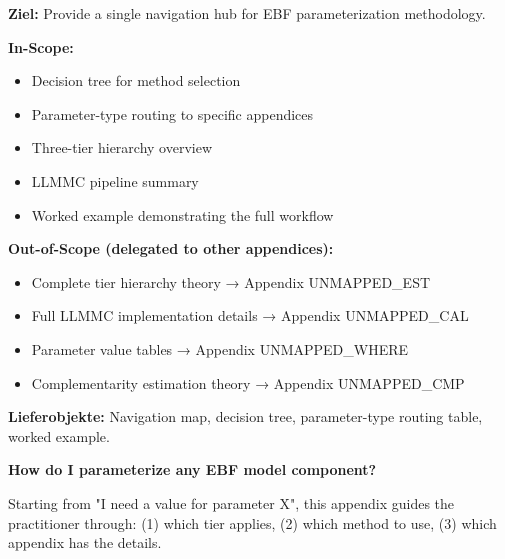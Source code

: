 \begin{tcolorbox}[colback=gray!5!white, colframe=gray!75!black, title=Appendix Scope:]
\textbf{Ziel:} Provide a single navigation hub for EBF parameterization methodology.

\textbf{In-Scope:}
\begin{itemize}[nosep]
    \item Decision tree for method selection
    \item Parameter-type routing to specific appendices
    \item Three-tier hierarchy overview
    \item LLMMC pipeline summary
    \item Worked example demonstrating the full workflow
\end{itemize}

\textbf{Out-of-Scope (delegated to other appendices):}
\begin{itemize}[nosep]
    \item Complete tier hierarchy theory → Appendix UNMAPPED_EST
    \item Full LLMMC implementation details → Appendix UNMAPPED_CAL
    \item Parameter value tables → Appendix UNMAPPED_WHERE
    \item Complementarity estimation theory → Appendix UNMAPPED_CMP
\end{itemize}

\textbf{Lieferobjekte:} Navigation map, decision tree, parameter-type routing table, worked example.
\end{tcolorbox}


\begin{tcolorbox}[colback=orange!5!white, colframe=orange!75!black, title=Fundamental Question]
\textbf{How do I parameterize any EBF model component?}

Starting from "I need a value for parameter X", this appendix guides the practitioner through:
(1) which tier applies, (2) which method to use, (3) which appendix has the details.
\end{tcolorbox}


